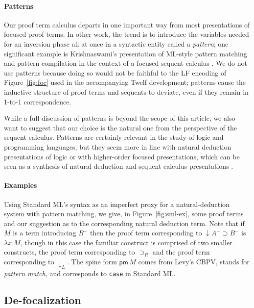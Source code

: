 \documentclass[acmtocl]{robtrans}\pdfoutput=1
\newcommand{\dslt}[2]{{#1}.{#2}}      \newcommand{\usrt}[1]{\{{#1}\}}       \newcommand{\uslt}[1]{\mathsf{pm}\,{#1}}
\begin{document}
\paragraph*{Patterns}
Our proof term calculus departs in one important way from most
presentations of focused proof terms. In other work, the trend is to
introduce the variables needed for an inversion phase all at once in a
syntactic entity called a {\it pattern}; one significant example is
Krishnaswami's presentation of ML-style pattern matching and pattern
compilation in the context of a focused sequent calculus
\cite{krishnaswami09focusing}. We do not use patterns because doing so
would not be faithful to the LF encoding of Figure~\ref{fig:foc} used
in the accompanying Twelf development; patterns cause the inductive
structure of proof terms and sequents to deviate, even if they remain
in 1-to-1 correspondence. 

While a full discussion of patterns is
beyond the scope of this article, we also want to suggest that our
choice is the natural one from the perspective of the sequent
calculus. Patterns are certainly relevant in the study of logic and
programming languages, but they seem more in line with natural
deduction presentations of logic or with higher-order focused
presentations, which can be seen as a synthesis of natural deduction
and sequent calculus presentations
\cite{zeilberger09logical,brock10focused}.

\paragraph*{Examples}
Using Standard ML's syntax as an imperfect proxy for a
natural-deduction system with pattern matching, we give, in
Figure~\ref{fig:sml-ex}, some proof terms and our suggestion as to the
corresponding natural deduction term. Note that if $M$ is a term
introducing $B^-$ then the proof term corresponding to
${\downarrow}A^- \supset B^-$ is $\lambda \dslt{x}{M}$, though in this
case the familiar construct is comprised of two smaller constructs,
the proof term corresponding to ${\supset}_R$ and the proof term
corresponding to ${\downarrow}_L$. The spine form $\uslt{M}$ comes
from Levy's CBPV, stands for {\it pattern match}, and corresponds to
\verb'case' in Standard ML.



\subsection{De-focalization}\label{sec:soundness}
\end{document}
